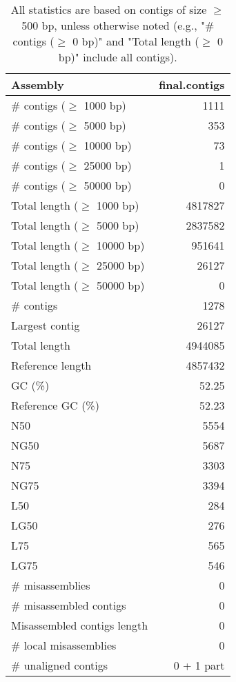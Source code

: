 \documentclass[12pt,a4paper]{article}
\begin{document}
\begin{table}[ht]
\begin{center}
\caption{All statistics are based on contigs of size $\geq$ 500 bp, unless otherwise noted (e.g., "\# contigs ($\geq$ 0 bp)" and "Total length ($\geq$ 0 bp)" include all contigs).}
\begin{tabular}{|l*{1}{|r}|}
\hline
Assembly & final.contigs \\ \hline
\# contigs ($\geq$ 1000 bp) & 1111 \\ \hline
\# contigs ($\geq$ 5000 bp) & 353 \\ \hline
\# contigs ($\geq$ 10000 bp) & 73 \\ \hline
\# contigs ($\geq$ 25000 bp) & 1 \\ \hline
\# contigs ($\geq$ 50000 bp) & 0 \\ \hline
Total length ($\geq$ 1000 bp) & 4817827 \\ \hline
Total length ($\geq$ 5000 bp) & 2837582 \\ \hline
Total length ($\geq$ 10000 bp) & 951641 \\ \hline
Total length ($\geq$ 25000 bp) & 26127 \\ \hline
Total length ($\geq$ 50000 bp) & 0 \\ \hline
\# contigs & 1278 \\ \hline
Largest contig & 26127 \\ \hline
Total length & 4944085 \\ \hline
Reference length & 4857432 \\ \hline
GC (\%) & 52.25 \\ \hline
Reference GC (\%) & 52.23 \\ \hline
N50 & 5554 \\ \hline
NG50 & 5687 \\ \hline
N75 & 3303 \\ \hline
NG75 & 3394 \\ \hline
L50 & 284 \\ \hline
LG50 & 276 \\ \hline
L75 & 565 \\ \hline
LG75 & 546 \\ \hline
\# misassemblies & 0 \\ \hline
\# misassembled contigs & 0 \\ \hline
Misassembled contigs length & 0 \\ \hline
\# local misassemblies & 0 \\ \hline
\# unaligned contigs & 0 + 1 part \\ \hline

\end{tabular}
\end{center}
\end{table}
\end{document}
